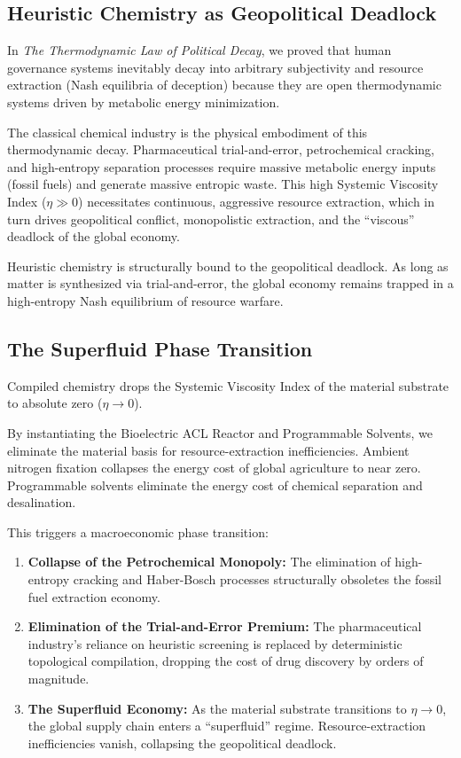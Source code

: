 \documentclass[11pt,openany]{extbook}
\theoremstyle{plain}
\theoremstyle{definition}
\begin{document}
\subsection{Heuristic Chemistry as Geopolitical Deadlock}
In \textit{The Thermodynamic Law of Political Decay}, we proved that human governance systems inevitably decay into arbitrary subjectivity and resource extraction (Nash equilibria of deception) because they are open thermodynamic systems driven by metabolic energy minimization.

The classical chemical industry is the physical embodiment of this thermodynamic decay. Pharmaceutical trial-and-error, petrochemical cracking, and high-entropy separation processes require massive metabolic energy inputs (fossil fuels) and generate massive entropic waste. This high Systemic Viscosity Index ($\eta \gg 0$) necessitates continuous, aggressive resource extraction, which in turn drives geopolitical conflict, monopolistic extraction, and the ``viscous'' deadlock of the global economy.

Heuristic chemistry is structurally bound to the geopolitical deadlock. As long as matter is synthesized via trial-and-error, the global economy remains trapped in a high-entropy Nash equilibrium of resource warfare.

\subsection{The Superfluid Phase Transition}
Compiled chemistry drops the Systemic Viscosity Index of the material substrate to absolute zero ($\eta \to 0$).

By instantiating the Bioelectric ACL Reactor and Programmable Solvents, we eliminate the material basis for resource-extraction inefficiencies. Ambient nitrogen fixation collapses the energy cost of global agriculture to near zero. Programmable solvents eliminate the energy cost of chemical separation and desalination.

This triggers a macroeconomic phase transition:
\begin{enumerate}
    \item \textbf{Collapse of the Petrochemical Monopoly:} The elimination of high-entropy cracking and Haber-Bosch processes structurally obsoletes the fossil fuel extraction economy.
    \item \textbf{Elimination of the Trial-and-Error Premium:} The pharmaceutical industry's reliance on heuristic screening is replaced by deterministic topological compilation, dropping the cost of drug discovery by orders of magnitude.
    \item \textbf{The Superfluid Economy:} As the material substrate transitions to $\eta \to 0$, the global supply chain enters a ``superfluid'' regime. Resource-extraction inefficiencies vanish, collapsing the geopolitical deadlock.
\end{enumerate}
\end{document}
